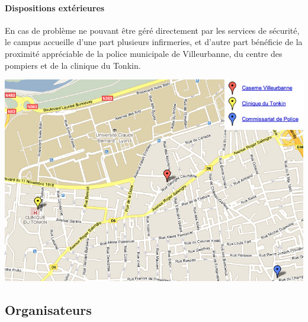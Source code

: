 \documentclass[hidelinks, paper=a4, fontsize=13pt]{report}
\begin{document}
\paragraph{Dispositions extérieures}
En cas de problème ne pouvant être géré directement par les services de sécurité, le campus accueille d’une part plusieurs infirmeries, et d’autre part bénéficie de la proximité appréciable de la police municipale de Villeurbanne, du centre des pompiers et de la clinique du Tonkin.
\begin{center}
	\includegraphics[scale=0.6]{Annexes/Plans/centreSecours}
\end{center}
\newpage
\subsection{Organisateurs}
\end{document}
